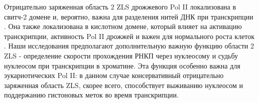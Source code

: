     Отрицательно заряженная область 2 ZLS дрожжевого Pol II  локализована в свитч-2 домене и, вероятно, важна для разделения нитей ДНК при транскрипции \cite{kettenberger_complete_2004}. Она также локализована в кислотном домене, который влияет на активацию транскрипции, активность Pol II дрожжей и важен для нормального роста клеток \cite{xiao_highly_1994}. Наши исследования предполагают дополнительную важную функцию области 2 ZLS - определение скорости прохождения РНКП через нуклеосому и судьбу нуклеосом при транскрипции в хроматине. Эта функция особенно важна для эукариотических Pol II: в данном случае консервативный отрицательно заряженная область ZLS, скорее всего, способствует выживанию нуклеосом и поддержанию гистоновых меток во время транскрипции.
    
    

